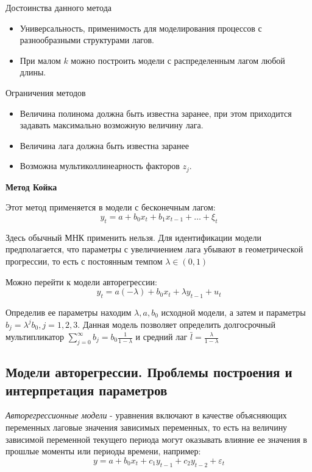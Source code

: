 \documentclass[aps,%
12pt,%
final,%
oneside,
onecolumn,%
musixtex, %
superscriptaddress,%
centertags]{article} %
\theoremstyle{plain}
\theoremstyle{definition}
\theoremstyle{remark}
\begin{document}
Достоинства данного метода

\begin{itemize}
	\item Универсальность, применимость для моделирования процессов с разнообразными структурами лагов.
	\item При малом $k$ можно построить модели с распределенным лагом любой длины.
\end{itemize}

Ограничения методов

\begin{itemize}
	\item  Величина полинома должна быть известна заранее, при этом приходится задавать максимально возможную величину лага.
	\item Величина лага должна быть известна заранее
	\item Возможна мультиколлинеарность факторов $z_j$.
\end{itemize}

\textbf{Метод Койка}

Этот метод применяется в модели с бесконечным лагом:
$$y_t = a+b_0x_t + b_1x_{t-1} + \ldots + \xi_t$$

Здесь обычный МНК применить нельзя. Для идентификации модели предполагается, что параметры с увеличиением лага убывают в геометрической прогрессии, то есть с постоянным темпом $\lambda \in (0,1)$

Можно перейти к модели авторегрессии:
$$y_t = a(-\lambda) + b_0 x_t + \lambda y_{t-1} + u_t$$

Определив ее параметры находим $\lambda,a,b_0$ исходной модели, а затем и параметры $b_j = \lambda^j b_0, j = 1,2,3$. Данная модель позволяет определить долгосрочный мультипликатор $\sum\limits_{j=0}^{\infty} b_j = b_0 \frac{1}{1-\lambda}$ и средний лаг $\bar{l} = \frac{\lambda}{1-\lambda}$


\newpage
\subsection{Модели авторегрессии. Проблемы построения и интерпретация параметров}

\textit{Авторегрессионные модели} - уравнения включают в качестве объясняющих переменных лаговые значения зависимых переменных,  то есть на величину зависимой переменной текущего периода могут оказывать влияние ее значения в прошлые моменты или периоды времени, например:
$$y = a + b_0x_t + c_1y_{t-1} + c_2y_{t-2} + \varepsilon_t$$
\end{document}
